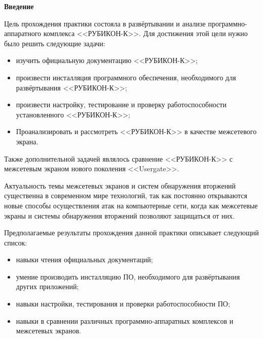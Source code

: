 \newcommand{\definition}[1]{\textbf{#1}}

\newcommand{\CLIA}{\textbf{CLI-A}}
\newcommand{\CLIB}{\textbf{CLI-B}}
\newcommand{\CLIEXT}{\textbf{CLI-EXT}}
\newcommand{\DC}{\textbf{DC}}
\newcommand{\UTM}{\textbf{UTM}}
\newcommand{\ISP}{\textbf{ISP}}

\begin{center}
	\textbf{\Large Введение}
\end{center}

Цель прохождения практики состояла в развёртывании и анализе программно-аппаратного комплекса <<РУБИКОН-К>>. Для достижения этой цели нужно было решить следующие задачи:
		
\begin{itemize}[nosep]
	\item изучить официальную документацию <<РУБИКОН-К>>;
			
	\item произвести инсталляция программного обеспечения, необходимого для развёртывания <<РУБИКОН-К>>;
			
	\item произвести настройку, тестирование и проверку работоспособности установленного <<РУБИКОН-К>>;
			
	\item Проанализировать и рассмотреть <<РУБИКОН-К>> в качестве межсетевого экрана.
\end{itemize}
		
\noindent Также дополнительной задачей являлось сравнение <<РУБИКОН-К>> с межсетевым экраном нового поколения <<Usergate>>.

Актуальность темы межсетевых экранов и систем обнаружения вторжений существенна в современном мире технологий, так как постоянно открываются новые способы осуществления атак на компьютерные сети, когда как межсетевые экраны и системы обнаружения вторжений позволяют защищаться от них. 

Предполагаемые результаты прохождения данной практики описывает следующий список:

\begin{itemize}[nosep]
	\item навыки чтения официальных документаций;
		
	\item умение производить инсталляцию ПО, необходимого для развёртывания других приложений;
		
	\item навыки настройки, тестирования и проверки работоспособности ПО;
	
	\item навыки в сравнении различных программно-аппаратных комплексов и межсетевых экранов.
\end{itemize}

